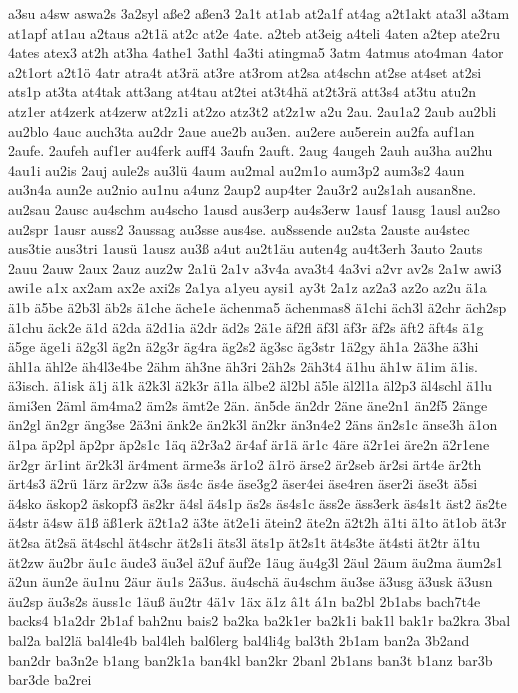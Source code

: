 {a3su
a4sw
aswa2s
3a2syl
aße2
aßen3
2a1t
at1ab
at2a1f
at4ag
a2t1akt
ata3l
a3tam
at1apf
at1au
a2taus
a2t1ä
at2c
at2e
4ate.
a2teb
at3eig
a4teli
4aten
a2tep
ate2ru
4ates
atex3
at2h
at3ha
4athe1
3athl
4a3ti
atingma5
3atm
4atmus
ato4man
4ator
a2t1ort
a2t1ö
4atr
atra4t
at3rä
at3re
at3rom
at2sa
at4schn
at2se
at4set
at2si
ats1p
at3ta
at4tak
att3ang
at4tau
at2tei
at3t4hä
at2t3rä
att3s4
at3tu
atu2n
atz1er
at4zerk
at4zerw
at2z1i
at2zo
atz3t2
at2z1w
a2u
2au.
2au1a2
2aub
au2bli
au2blo
4auc
auch3ta
au2dr
2aue
aue2b
au3en.
au2ere
au5erein
au2fa
auf1an
2aufe.
2aufeh
auf1er
au4ferk
auff4
3aufn
2auft.
2aug
4augeh
2auh
au3ha
au2hu
4au1i
au2is
2auj
aule2s
au3lü
4aum
au2mal
au2m1o
aum3p2
aum3s2
4aun
au3n4a
aun2e
au2nio
au1nu
a4unz
2aup2
aup4ter
2au3r2
au2s1ah
ausan8ne.
au2sau
2ausc
au4schm
au4scho
1ausd
aus3erp
au4s3erw
1ausf
1ausg
1ausl
au2so
au2spr
1ausr
auss2
3aussag
au3sse
aus4se.
au8ssende
au2sta
2auste
au4stec
aus3tie
aus3tri
1ausü
1ausz
au3ß
a4ut
au2t1äu
auten4g
au4t3erh
3auto
2auts
2auu
2auw
2aux
2auz
auz2w
2a1ü
2a1v
a3v4a
ava3t4
4a3vi
a2vr
av2s
2a1w
awi3
awi1e
a1x
ax2am
ax2e
axi2s
2a1ya
a1yeu
aysi1
ay3t
2a1z
az2a3
az2o
az2u
ä1a
ä1b
ä5be
ä2b3l
äb2s
ä1che
äche1e
ächenma5
ächenmas8
ä1chi
äch3l
ä2chr
äch2sp
ä1chu
äck2e
ä1d
ä2da
ä2d1ia
ä2dr
äd2s
2ä1e
äf2fl
äf3l
äf3r
äf2s
äft2
äft4s
ä1g
ä5ge
äge1i
ä2g3l
äg2n
ä2g3r
äg4ra
äg2s2
äg3sc
äg3str
1ä2gy
äh1a
2ä3he
ä3hi
ähl1a
ähl2e
äh4l3e4be
2ähm
äh3ne
äh3ri
2äh2s
2äh3t4
ä1hu
äh1w
ä1im
ä1is.
ä3isch.
ä1isk
ä1j
ä1k
ä2k3l
ä2k3r
ä1la
älbe2
äl2bl
ä5le
äl2l1a
äl2p3
äl4schl
ä1lu
ämi3en
2äml
äm4ma2
äm2s
ämt2e
2än.
än5de
än2dr
2äne
äne2n1
än2f5
2änge
än2gl
än2gr
äng3se
2ä3ni
änk2e
än2k3l
än2kr
än3n4e2
2äns
än2s1c
änse3h
ä1on
ä1pa
äp2pl
äp2pr
äp2s1c
1äq
ä2r3a2
är4af
är1ä
är1c
4äre
ä2r1ei
äre2n
ä2r1ene
är2gr
är1int
är2k3l
är4ment
ärme3s
är1o2
ä1rö
ärse2
är2seb
är2si
ärt4e
är2th
ärt4s3
ä2rü
1ärz
är2zw
ä3s
äs4c
äs4e
äse3g2
äser4ei
äse4ren
äser2i
äse3t
ä5si
ä4sko
äskop2
äskopf3
äs2kr
ä4sl
ä4s1p
äs2s
äs4s1c
äss2e
äss3erk
äs4s1t
äst2
äs2te
ä4str
ä4sw
ä1ß
äß1erk
ä2t1a2
ä3te
ät2e1i
ätein2
äte2n
ä2t2h
ä1ti
ä1to
ät1ob
ät3r
ät2sa
ät2sä
ät4schl
ät4schr
ät2s1i
äts3l
äts1p
ät2s1t
ät4s3te
ät4sti
ät2tr
ä1tu
ät2zw
äu2br
äu1c
äude3
äu3el
ä2uf
äuf2e
1äug
äu4g3l
2äul
2äum
äu2ma
äum2s1
ä2un
äun2e
äu1nu
2äur
äu1s
2ä3us.
äu4schä
äu4schm
äu3se
ä3usg
ä3usk
ä3usn
äu2sp
äu3s2s
äuss1c
1äuß
äu2tr
4ä1v
1äx
ä1z
â1t
á1n
ba2bl
2b1abs
bach7t4e
backs4
b1a2dr
2b1af
bah2nu
bais2
ba2ka
ba2k1er
ba2k1i
bak1l
bak1r
ba2kra
3bal
bal2a
bal2lä
bal4le4b
bal4leh
bal6lerg
bal4li4g
bal3th
2b1am
ban2a
3b2and
ban2dr
ba3n2e
b1ang
ban2k1a
ban4kl
ban2kr
2banl
2b1ans
ban3t
b1anz
bar3b
bar3de
ba2rei
}
